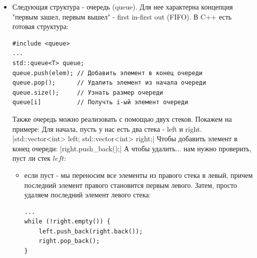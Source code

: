 \documentclass[a4paper,12pt]{article}
\begin{document}
\begin{itemize}
\begin{enumerate}
\item $x_3 = 3$. Текущий $x$ больше последнего элемента $minsstack$, значит добавляем не
$x$, а последний элемент $minsstack$, т.е. \uline{левую часть} std::min(...):

\begin{verbatim}
stack.push_back(x);
minsstack.push_back(std::min(|\ttfamily\uline{minsstack.back()}|, x));
\end{verbatim}
$stack = [5, 2, 3]$; $minsstack = [5, 2, 2]$

\item $x_4 = 4$. $x_4 > x_2$, значит в конец minsstack добавляем $x_2$.
$stack = [5, 2, 3, 4]$; $minsstack = [5, 2, 2, 2]$

\item $x_5 = 1$, $x_5 < x_2$, значит в конец minsstack добавляем $x_5$.
$stack = [5, 2, 3, 4, 1]$; $minsstack = [5, 2, 2, 2, 1]$
\end{enumerate}

Таким образом получается стек обычный и стек префиксных минимумов. Затем, если нам
нужно удалить последний элемент стека, мы просто удаляем его из обоих стеков:

\begin{verbatim}
stack.pop_back();
minsstack.pop_back();
\end{verbatim}

\item Следующая структура - очередь (queue). Для нее характерна концепция "первым зашел,
первым вышел" - first in-first out (FIFO). В C++ есть готовая структура:
\begin{verbatim}
#include <queue>
...
std::queue<T> queue;
queue.push(elem); // Добавить элемент в конец очереди
queue.pop();      // Удалить элемент из начала очереди
queue.size();     // Узнать размер очереди
queue[i]          // Получть i-ый элемент очереди
\end{verbatim}

Также очередь можно реализовать с помощью двух стеков. Покажем на примере:
Для начала, пусть у нас есть два стека - left и right.
|std::vector<int> left; std::vector<int> right;|
Чтобы добавить элемент в конец очереди:
|right.push_back();|
А чтобы удалить... нам нужно проверить, пуст ли стек $left$:
\begin{itemize}
\item если пуст - мы переносим все элементы из правого стека в левый, причем последний
элемент правого становится первым левого. Затем, просто удаляем последний элемент
левого стека:
\begin{verbatim}
...
while (!right.empty()) {
    left.push_back(right.back());
    right.pop_back();
}


\end{verbatim}
\end{itemize}
\end{itemize}
\end{document}
